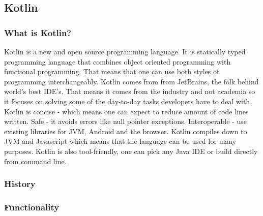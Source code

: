 \subsection{Kotlin}

\subsubsection{What is Kotlin?}
Kotlin is a new and open source programming language. It is statically typed programming language that combines object oriented programming with functional programming. That means that one can use both styles of programming interchangeably. Kotlin comes from from JetBrains, the folk behind world's best IDE's. That means it comes from the industry and not academia so it focuses on solving some of the day-to-day tasks developers have to deal with. Kotlin is concise - which means one can expect to reduce amount of code lines written. Safe - it avoids errors like null pointer exceptions. Interoperable - use existing libraries for JVM, Android and the browser. Kotlin compiles down to JVM and Javascript which means that the language can be used for many purposes. Kotlin is also tool-friendly, one can pick any Java IDE or build directly from command line.
\subsubsection{History}
\subsubsection{Functionality} 
